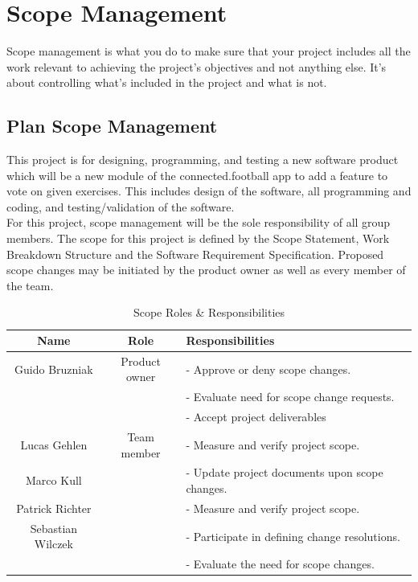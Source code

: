 \section{Scope Management}
\label{sec:scope}
Scope management is what you do to make sure that your project includes all the work relevant to achieving the project’s objectives and not anything else. It’s about controlling what’s included in the project and what is not.

\subsection{Plan Scope Management}
This project is for designing, programming, and testing a new software product which will be a new module of the connected.football app to add a feature to vote on given exercises. This includes design of the software, all programming and coding, and testing/validation of the software.\\
For this project, scope management will be the sole responsibility of all group members. The scope for this project is defined by the Scope Statement, Work Breakdown Structure and the Software Requirement Specification. Proposed scope changes may be initiated by the product owner as well as every member of the team.

\begin{table}[H]
\centering
\begin{tabular}{|c|c|l|}
\hline

\cellcolor{gray}Name & 
\cellcolor{gray}Role &
\cellcolor{gray}Responsibilities \\\hline
Guido Bruzniak & Product owner &
- Approve or deny scope changes.\\&&
- Evaluate need for scope change requests.\\&&
- Accept project deliverables\\\hline
Lucas Gehlen&Team member&- Measure and verify project scope.\\
Marco Kull&&- Update project documents upon scope changes.\\
Patrick Richter&&- Measure and verify project scope.\\
Sebastian Wilczek&&- Participate in defining change resolutions.\\
&&- Evaluate the need for scope changes.\\\hline
\end{tabular}
\caption{Scope Roles \& Responsibilities}
\end{table}

